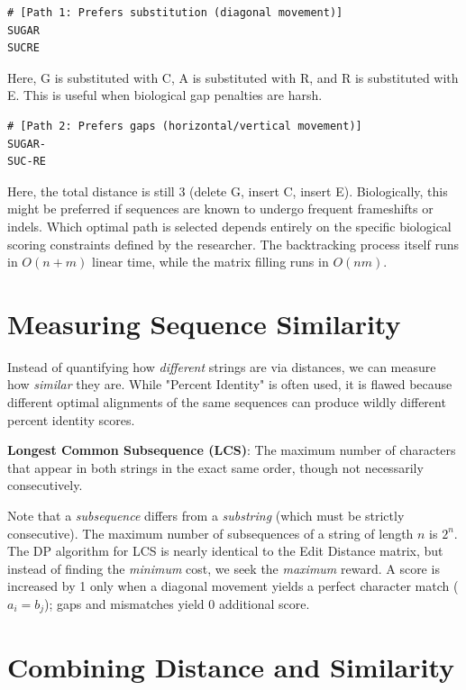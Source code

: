 \documentclass[11pt,a4paper]{article}
\begin{document}
\begin{verbatim}
# [Path 1: Prefers substitution (diagonal movement)]
SUGAR
SUCRE
\end{verbatim}
Here, G is substituted with C, A is substituted with R, and R is substituted with E. This is useful when biological gap penalties are harsh.

\begin{verbatim}
# [Path 2: Prefers gaps (horizontal/vertical movement)]
SUGAR-
SUC-RE
\end{verbatim}
Here, the total distance is still 3 (delete G, insert C, insert E). Biologically, this might be preferred if sequences are known to undergo frequent frameshifts or indels. Which optimal path is selected depends entirely on the specific biological scoring constraints defined by the researcher. The backtracking process itself runs in \(O(n+m)\) linear time, while the matrix filling runs in \(O(nm)\).

\section{Measuring Sequence Similarity}

Instead of quantifying how \textit{different} strings are via distances, we can measure how \textit{similar} they are. While "Percent Identity" is often used, it is flawed because different optimal alignments of the same sequences can produce wildly different percent identity scores.

\begin{important}
\textbf{Longest Common Subsequence (LCS)}: The maximum number of characters that appear in both strings in the exact same order, though not necessarily consecutively. 
\end{important}

Note that a \textit{subsequence} differs from a \textit{substring} (which must be strictly consecutive). The maximum number of subsequences of a string of length \(n\) is \(2^n\). The DP algorithm for LCS is nearly identical to the Edit Distance matrix, but instead of finding the \textit{minimum} cost, we seek the \textit{maximum} reward. A score is increased by 1 only when a diagonal movement yields a perfect character match (\(a_i = b_j\)); gaps and mismatches yield 0 additional score. 

\section{Combining Distance and Similarity}
\end{document}

